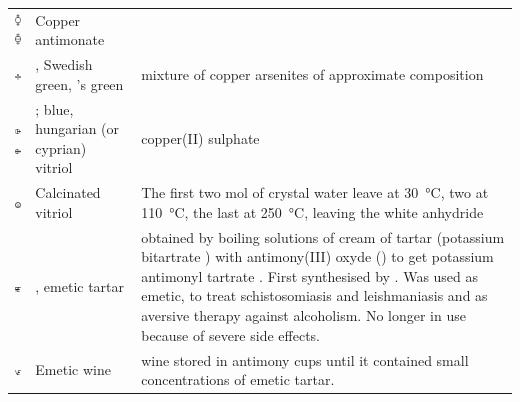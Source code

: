 \documentclass[british,final,landscape]{scrartcl}
\begin{document}
\begin{refsection}
\begin{supertabular}{p{0.3\textwidth}p{0.34\textwidth}p{0.34\textwidth}}
   \includegraphics[width=5mm]{Compounds/CopperAntimonate} \includegraphics[width=5mm]{Compounds/CopperAntimonate2} & Copper antimonate & \\
   \includegraphics[width=5mm]{Compounds/CuprumArsenicatum} & , Swedish green, 's green & mixture of copper arsenites of approximate composition \\
   \includegraphics[width=5mm]{Compounds/CuSO4} \includegraphics[width=5mm]{Compounds/CuSO4-2} & ; blue, hungarian (or cyprian) vitriol & copper(II) sulphate  \\
   \includegraphics[width=5mm]{Compounds/CalcinatedVitriol} & Calcinated vitriol & The first two mol of crystal water leave  at \SI{30}{\celsius}, two at \SI{110}{\celsius}, the last at \SI{250}{\celsius}, leaving the white anhydride  \\
   \includegraphics[width=5mm]{Compounds/EmeticTartar} & , emetic tartar & obtained by boiling solutions of cream of tartar (potassium bitartrate ) with antimony(III) oxyde  () to get potassium antimonyl tartrate . First synthesised by . Was used as emetic, to treat schistosomiasis and leishmaniasis and as aversive therapy against alcoholism. No longer in use because of severe side effects. \\
   \includegraphics[width=5mm]{Compounds/EmeticWine} & Emetic wine & wine stored in antimony cups until it contained small concentrations of emetic tartar. \\

\end{supertabular}
\end{refsection}
\end{document}
